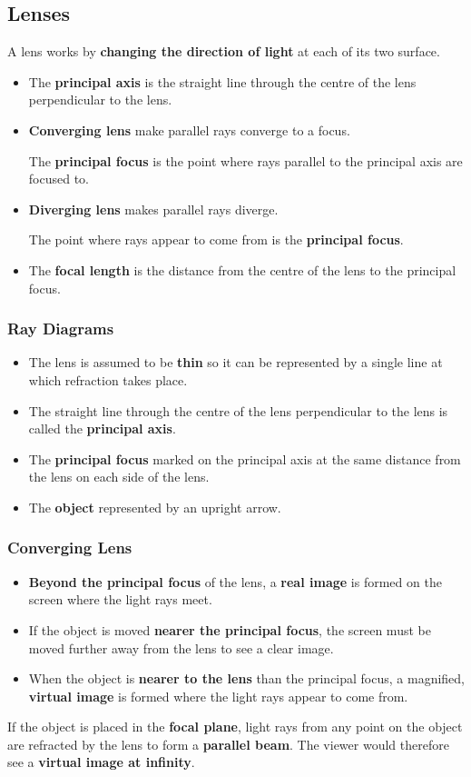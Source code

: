 \subsection{Lenses}

A lens works by \textbf{changing the direction of light} at each of its two surface.
\begin{itemize}
    \item The \textbf{principal axis} is the straight line through the centre of the lens perpendicular to the lens.
    \item \textbf{Converging lens} make parallel rays converge to a focus.
    
        The \textbf{principal focus} is the point where rays parallel to the principal axis are focused to.
    \item \textbf{Diverging lens} makes parallel rays diverge.

        The point where rays appear to come from is the \textbf{principal focus}.
    \item The \textbf{focal length} is the distance from the centre of the lens to the principal focus.
\end{itemize}

\subsubsection*{Ray Diagrams}

\begin{itemize}
    \item The lens is assumed to be \textbf{thin} so it can be represented by a single line at which refraction takes place.
    \item The straight line through the centre of the lens perpendicular to the lens is called the \textbf{principal axis}.
    \item The \textbf{principal focus} marked on the principal axis at the same distance from the lens on each side of the lens.
    \item The \textbf{object} represented by an upright arrow.
\end{itemize}

\subsubsection*{Converging Lens}

\begin{itemize}
    \item \textbf{Beyond the principal focus} of the lens, a \textbf{real image} is formed on the screen where the light rays meet.
    \item If the object is moved \textbf{nearer the principal focus}, the screen must be moved further away from the lens to see a clear image.
    \item When the object is \textbf{nearer to the lens} than the principal focus, a magnified, \textbf{virtual image} is formed where the light rays appear to come from.
\end{itemize}

If the object is placed in the \textbf{focal plane}, light rays from any point on the object are refracted by the lens to form a \textbf{parallel beam}. The viewer would therefore see a \textbf{virtual image at infinity}.
